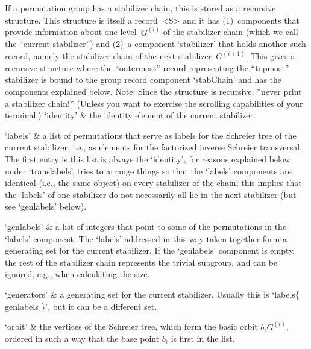 
\def\labelto#1{\buildrel\lower0.8ex\hbox{$\scriptstyle #1$}\over\to}%


If a  permutation group  has a   stabilizer chain, this   is stored  as a
recursive structure. This  structure  is itself  a record~<S>  and it has
(1)~components that provide information about  one level~$G^{(i)}$ of the
stabilizer chain (which  we call  the  ``current stabilizer'')  and (2)~a
component `stabilizer'  that  holds   another such  record,   namely  the
stabilizer chain  of    the next stabilizer~$G^{(i+1)}$.  This  gives   a
recursive  structure  where the  ``outermost''  record  representing  the
``topmost'' stabilizer is bound to the group record component `stabChain'
and   has the components explained below.    Note: Since the structure is
recursive, *never print a stabilizer chain!* (Unless you want to exercise
the scrolling capabilities of your terminal.)
\beginitems
`identity' &
        the identity element of the current stabilizer.

`labels' &
        a list of permutations that serve as labels for the Schreier tree
        of  the current stabilizer,  i.e., as elements for the factorized
        inverse Schreier transversal.  The  first entry  is this list  is
        always the  `identity',    for  reasons explained   below   under
        `translabels'.  {\GAP}  tries  to  arrange   things so  that  the
        `labels' components are  identical (i.e., the same {\GAP} object)
        on every stabilizer of the chain;  this implies that the `labels'
        of   one stabilizer  do  not  necessarily   all lie  in the  next
        stabilizer (but see `genlabels' below).

`genlabels' &
        a list of integers that point to some  of the permutations in the
        `labels' component. The    `labels' addressed in this   way taken
        together form a generating set for the current stabilizer. If the
        `genlabels' component is empty,  the rest of the stabilizer chain
        represents  the trivial subgroup, and  can be ignored, e.g., when
        calculating the size.

`generators' &
        a generating set for    the current stabilizer. Usually this   is
        `labels\{ genlabels \}', but it can be a different set.

`orbit' &
        the vertices of  the Schreier tree,  which  form the basic  orbit
        $b_iG^{(i)}$, ordered in such a way that the  base point $b_i$ is
        first in the list.

